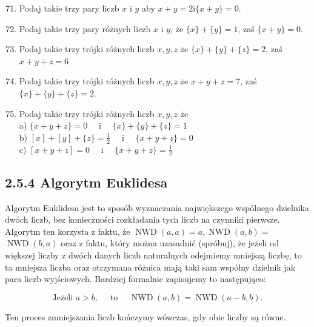 \documentclass[10pt]{article}
\begin{document}
\begin{enumerate}
  \setcounter{enumi}{70}
  \item Podaj takie trzy pary liczb \(x\) i \(y\) aby \(x+y=2 \mathrm{i}\{x+y\}=0\).
  \item Podaj takie trzy pary różnych liczb \(x\) i \(y\), że \(\{x\}+\{y\}=1\), zaś \(\{x+y\}=0\).
  \item Podaj takie trzy trójki różnych liczb \(x, y, z\) że \(\{x\}+\{y\}+\{z\}=2\), zaś \(x+y+z=6\)
  \item Podaj takie trzy trójki różnych liczb \(x, y, z\) że \(x+y+z=7\), zaś \(\{x\}+\{y\}+\{z\}=2\).
  \item Podaj takie trzy trójki różnych liczb \(x, y, z\) że\\
a) \(\{x+y+z\}=0 \quad\) i \(\quad\{x\}+\{y\}+\{z\}=1\)\\
b) \([x]+[y]+\{z\}=\frac{1}{2} \quad\) i \(\quad\{x+y+z\}=0\)\\
c) \([x+y+z]=0 \quad\) i \(\quad\{x+y+z\}=\frac{1}{2}\)
\end{enumerate}

\subsection*{2.5.4 Algorytm Euklidesa}
Algorytm Euklidesa jest to sposób wyznaczania największego wspólnego dzielnika dwóch liczb, bez konieczności rozkładania tych liczb na czynniki pierwsze. Algorytm ten korzysta z faktu, że \(\operatorname{NWD}(a, a)=a, \operatorname{NWD}(a, b)=\) \(\operatorname{NWD}(b, a)\) oraz z faktu, który można uzasadnić (spróbuj), że jeżeli od większej liczby z dwóch danych liczb naturalnych odejmiemy mniejszą liczbę, to\\
ta mniejsza liczba oraz otrzymana różnica mają taki sam wspólny dzielnik jak para liczb wyjściowych. Bardziej formalnie zapisujemy to następująco:

\[
\text { Jeżeli } a>b, \quad \text { to } \quad \operatorname{NWD}(a, b)=\operatorname{NWD}(a-b, b) \text {. }
\]

Ten proces zmniejszania liczb kończymy wówczas, gdy obie liczby są równe.
\end{document}
